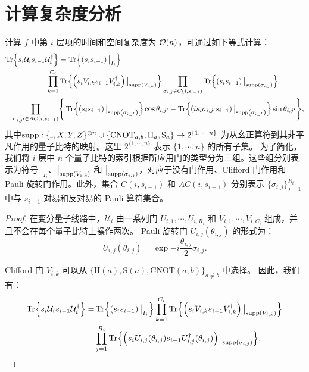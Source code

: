 \section{计算复杂度分析}
\begin{proposition}\label{prop:layer_terms}
    计算 $f$ 中第 $i$ 层项的时间和空间复杂度为 $\order{n}$，可通过如下等式计算：
    \begin{equation}\label{eq:i-layer_terms}
    \begin{aligned}
    \Tr{s_i\mathcal{U}_i s_{i-1}\mathcal{U}_i^\dagger}&=\Tr{\left(s_i s_{i-1}\right)\big|_{I_i}}\\
    \prod_{k=1}^{C_i}&\Tr{\left(s_iV_{i,k} s_{i-1}V_{i,k}^{\dagger}\right)\big|_{\text{supp} \left( V_{i,k} \right)}}\prod_{\sigma_{i,j}\in C(i,s_{i-1})}\Tr{\left(s_i s_{i-1}\right)\big|_{\text{supp} \left( \sigma_{i,j} \right)}}\\
    \prod_{\sigma_{i,j'}\in AC(i,s_{i-1})} &\Bigg\{ \Tr{\left(s_i s_{i-1}\right)\big|_{\text{supp} \left( \sigma_{i,j'} \right)}}\cos{\theta_{i,j'}}- \Tr{\left(is_i \sigma_{i,j'}s_{i-1}\right)\big|_{\text{supp} \left( \sigma_{i,j'} \right)}}\sin{\theta_{i,j'}}  \Bigg\},
    \end{aligned}
    \end{equation}
    其中$\text{supp}:\{\mathbb{I}, X, Y, Z\}^{\otimes n}\cup\{\mathrm{CNOT}_{a,b},\mathrm{H}_a,\mathrm{S}_a\}\rightarrow2^{\{1,\cdots, n\}}$ 为从幺正算符到其非平凡作用的量子比特的映射。这里 $2^{\{1,\cdots, n\}}$ 表示 $\{1,\cdots, n\}$ 的所有子集。
    为了简化，我们将 $i$ 层中 $n$ 个量子比特的索引根据所应用门的类型分为三组。这些组分别表示为符号 $\big|_{I_i}$、$\big|_{\text{supp} \left( V_{i,k} \right)}$ 和 $\big|_{\text{supp} \left( \sigma_{i,j} \right)}$，对应于没有门作用、Clifford 门作用和 Pauli 旋转门作用。此外，集合 $C(i,s_{i-1})$ 和 $AC(i,s_{i-1})$ 分别表示 $\{\sigma_{i,j}\}_{j=1}^{R_i}$ 中与 $s_{i-1}$ 对易和反对易的 Pauli 算符集合。
    
    \begin{proof}
    
    在变分量子线路中，$\mathcal{U}_i$ 由一系列门 $U_{i,1},\cdots,U_{i,R_i}$ 和 $V_{i,1},\cdots,V_{i,C_i}$ 组成，并且不会在每个量子比特上操作两次。
    Pauli 旋转门 $U_{i,j}(\theta_{i,j})$ 的形式为：
    \begin{equation}
      U_{i,j}(\theta_{i,j})=\exp{-i \frac{\theta_{i,j}}{2} \sigma_{i,j}}.
    \end{equation}
    
    Clifford 门 $V_{i,k}$ 可以从 $\{\mathrm{H}(a),\mathrm{S}(a),\mathrm{CNOT}(a,b) \}_ {a\neq b}$ 中选择。
    因此，我们有：
    \begin{equation}
      \begin{aligned}
        \Tr{s_i\mathcal{U}_i s_{i-1}\mathcal{U}_i^\dagger}=&\Tr{\left(s_i s_{i-1}\right)\big|_{I_i}}
        \prod_{k=1}^{C_i}\Tr{\left(s_iV_{i,k} s_{i-1}V_{i,k}^{\dagger}\right)\big|_{\text{supp} \left( V_{i,k} \right)}}\\
        &\prod_{j=1}^{R_i}\Tr{\left(s_i U_{i,j}(\theta_{i,j}) s_{i-1} U_{i,j}^\dagger(\theta_{i,j})\right) \big|_{\text{supp} \left( \sigma_{i,j} \right)}}.
      \end{aligned}
    \end{equation}
    

\end{proof}
\end{proposition}
